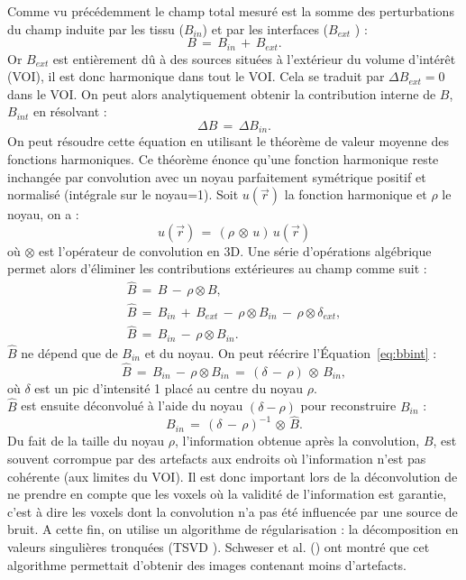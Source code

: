 {Comme vu précédemment le champ total mesuré est la somme des perturbations du champ induite
par les tissu ($B_{in}$) et par les interfaces ($B_{ext}$ ) :
\begin{equation}
B\,=\,B_{in}\,+\,B_{ext}.
\end{equation}
Or $B_{ext}$ est entièrement dû à des sources situées à l’extérieur du volume d’intérêt (VOI), il est donc
harmonique dans tout le VOI. Cela se traduit par $\Delta B_{ext} = 0$ dans le VOI. On peut alors analytiquement
obtenir la contribution interne de $B$, $B_{int}$ en résolvant :
\begin{equation}
\Delta B\,=\,\Delta B_{in}.
\end{equation}
On peut résoudre cette équation en utilisant le théorème de valeur moyenne des fonctions
harmoniques. Ce théorème énonce qu'une fonction harmonique reste inchangée par convolution avec
un noyau parfaitement symétrique positif et normalisé (intégrale sur le noyau=1). Soit $u(\vec{r})$ la fonction
harmonique et $\rho$ le noyau, on a :
\begin{equation}
u(\vec{r})\,=\,(\rho\, \otimes\,u)\,u(\vec{r})
\end{equation}
où $\otimes$ est l'opérateur de convolution en 3D. Une série d’opérations algébrique permet alors d'éliminer
les contributions extérieures au champ comme suit :
\begin{eqnarray}
\hat{B}\,=\,B\,-\,\rho\otimes B,\\
\hat{B}\,=\,B_{in}\,+\,B_{ext}\,-\,\rho\otimes B_{in}\,-\,\rho\otimes\delta_{ext},\\
\hat{B}\,=\,B_{in}\,-\,\rho\otimes B_{in}.\label{eq:bbint}
\end{eqnarray}
$\hat{B}$ ne dépend que de $B_{in}$ et du noyau. On peut réécrire l’Équation~\ref{eq:bbint} :
\begin{equation}
\hat{B}\,=\,B_{in}\,-\,\rho\otimes B_{in}\,=\,(\delta\,-\,\rho)\,\otimes\,B_{in},
\end{equation}
où $\delta$ est un pic d’intensité 1 placé au centre du noyau $\rho$.\\
$\hat{B}$ est ensuite déconvolué à l’aide du noyau $(\delta-\rho)$ pour reconstruire $B_{in}$ :
\begin{equation}
B_{in}\,=\,(\delta\,-\,\rho)^{-1}\,\otimes\,\hat{B}.
\end{equation}
Du fait de la taille du noyau $\rho$, l'information obtenue après la convolution, $B$, est souvent corrompue
par des artefacts aux endroits où l'information n'est pas cohérente (aux limites du VOI). Il est donc
important lors de la déconvolution de ne prendre en compte que les voxels où la validité de
l'information est garantie, c'est à dire les voxels dont la convolution n'a pas été influencée par une
source de bruit. A cette fin, on utilise un algorithme de régularisation : la décomposition en valeurs
singulières tronquées (TSVD \cite{Bertero2006}). Schweser et al. (\cite{Schweser2011}) ont montré que cet algorithme permettait d'obtenir
des images contenant moins d'artefacts.

}
